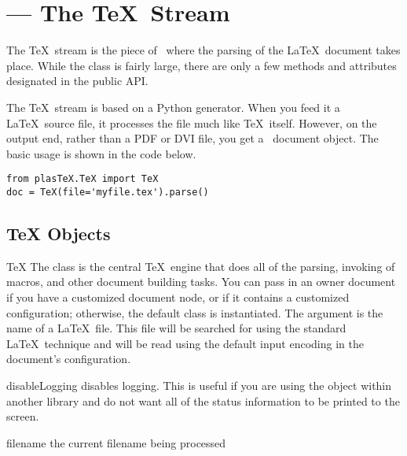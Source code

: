 
\section{ --- The \TeX\ Stream}


The \TeX\ stream is the piece of \plasTeX\ where the parsing of the
\LaTeX\ document takes place.  While the  class is fairly
large, there are only a few methods and attributes designated in the
public API.  

The \TeX\ stream is based on a Python generator.  When you feed it
a \LaTeX\ source file, it processes the file much like \TeX\ itself.
However, on the output end, rather than a PDF or DVI file, you get a 
\plasTeX\ document object.  The basic usage is shown in the code below.
\begin{verbatim}
from plasTeX.TeX import TeX
doc = TeX(file='myfile.tex').parse()
\end{verbatim}

\subsection{TeX Objects}

\begin{classdesc}{TeX}{}
The  class is the central \TeX\ engine that does all of the 
parsing, invoking of macros, and other document building tasks.
You can pass in an owner document if you have a customized document
node, or if it contains a customized configuration; otherwise, 
the default  class is instantiated.  The 
argument is the name of a \LaTeX\ file.  This file will be 
searched for using the standard \LaTeX\ technique and will be 
read using the default input encoding in the document's configuration.
\end{classdesc}

\begin{methoddesc}[TeX]{disableLogging}{}
disables logging.  This is useful if you are using the  object
within another library and do not want all of the status information to 
be printed to the screen.

\end{methoddesc}

\begin{memberdesc}[TeX]{filename}
the current filename being processed
\end{memberdesc}

